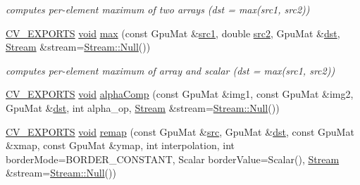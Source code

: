 \begin{DoxyCompactItemize}
\begin{DoxyCompactList}\small\item\em computes per-\/element maximum of two arrays (dst = max(src1, src2)) \end{DoxyCompactList}\item 
\hyperlink{core_2types__c_8h_a1bf9f0e121b54272da02379cfccd0a2b}{C\-V\-\_\-\-E\-X\-P\-O\-R\-T\-S} \hyperlink{legacy_8hpp_a8bb47f092d473522721002c86c13b94e}{void} \hyperlink{namespacecv_1_1gpu_a9ad29793ca0661136ea0dce7c571dab0}{max} (const Gpu\-Mat \&\hyperlink{core__c_8h_a897de4702c922f4cccda0d57ccdcafb3}{src1}, double \hyperlink{core__c_8h_a7561a36d48069d54a6c8ac4e4750edfd}{src2}, Gpu\-Mat \&\hyperlink{photo__c_8h_aed13e2a25279b24dc954073233fef7a5}{dst}, \hyperlink{classcv_1_1gpu_1_1Stream}{Stream} \&stream=\hyperlink{classcv_1_1gpu_1_1Stream_af96c23564834f88333dcb8997df553f1}{Stream\-::\-Null}())
\begin{DoxyCompactList}\small\item\em computes per-\/element maximum of array and scalar (dst = max(src1, src2)) \end{DoxyCompactList}\item 
\hyperlink{core_2types__c_8h_a1bf9f0e121b54272da02379cfccd0a2b}{C\-V\-\_\-\-E\-X\-P\-O\-R\-T\-S} \hyperlink{legacy_8hpp_a8bb47f092d473522721002c86c13b94e}{void} \hyperlink{namespacecv_1_1gpu_aa9da6f29377d091202616893fe055642}{alpha\-Comp} (const Gpu\-Mat \&img1, const Gpu\-Mat \&img2, Gpu\-Mat \&\hyperlink{photo__c_8h_aed13e2a25279b24dc954073233fef7a5}{dst}, int alpha\-\_\-op, \hyperlink{classcv_1_1gpu_1_1Stream}{Stream} \&stream=\hyperlink{classcv_1_1gpu_1_1Stream_af96c23564834f88333dcb8997df553f1}{Stream\-::\-Null}())
\item 
\hyperlink{core_2types__c_8h_a1bf9f0e121b54272da02379cfccd0a2b}{C\-V\-\_\-\-E\-X\-P\-O\-R\-T\-S} \hyperlink{legacy_8hpp_a8bb47f092d473522721002c86c13b94e}{void} \hyperlink{namespacecv_1_1gpu_a6043a8a9e72066a079e6b39939d4d997}{remap} (const Gpu\-Mat \&\hyperlink{legacy_8hpp_a371cd109b74033bc4366f584edd3dacc}{src}, Gpu\-Mat \&\hyperlink{photo__c_8h_aed13e2a25279b24dc954073233fef7a5}{dst}, const Gpu\-Mat \&xmap, const Gpu\-Mat \&ymap, int interpolation, int border\-Mode=B\-O\-R\-D\-E\-R\-\_\-\-C\-O\-N\-S\-T\-A\-N\-T, Scalar border\-Value=Scalar(), \hyperlink{classcv_1_1gpu_1_1Stream}{Stream} \&stream=\hyperlink{classcv_1_1gpu_1_1Stream_af96c23564834f88333dcb8997df553f1}{Stream\-::\-Null}())
\item 

\end{DoxyCompactItemize}
